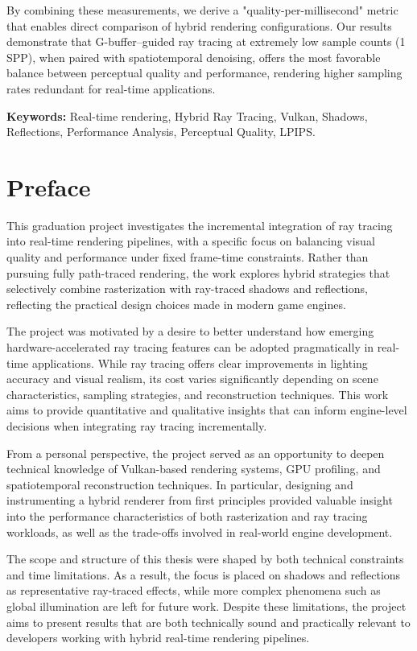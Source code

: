 \documentclass[12pt,a4paper]{report}
\newcommand{\daechapterNoNum}[1]{
  \chapter*{#1}
  \addcontentsline{toc}{chapter}{#1}
}
\begin{document}
By combining these measurements, we derive a "quality-per-millisecond" metric that enables direct comparison of hybrid rendering configurations.
Our results demonstrate that G-buffer–guided ray tracing at extremely low sample counts (1 SPP), when paired with spatiotemporal denoising, offers the most favorable balance between perceptual quality and performance,
rendering higher sampling rates redundant for real-time applications.
\begin{gbox}
\textbf{Keywords:} Real-time rendering, Hybrid Ray Tracing, Vulkan, Shadows, Reflections, Performance Analysis, Perceptual Quality, LPIPS.
\end{gbox}

\daechapterNoNum{Preface}
This graduation project investigates the incremental integration of ray tracing into real-time rendering pipelines, with a specific focus on balancing visual quality and performance under fixed frame-time constraints.
Rather than pursuing fully path-traced rendering, the work explores hybrid strategies that selectively combine rasterization with ray-traced shadows and reflections, reflecting the practical design choices made in modern game engines.

The project was motivated by a desire to better understand how emerging hardware-accelerated ray tracing features can be adopted pragmatically in real-time applications.
While ray tracing offers clear improvements in lighting accuracy and visual realism, its cost varies significantly depending on scene characteristics, sampling strategies, and reconstruction techniques.
This work aims to provide quantitative and qualitative insights that can inform engine-level decisions when integrating ray tracing incrementally.

From a personal perspective, the project served as an opportunity to deepen technical knowledge of Vulkan-based rendering systems, GPU profiling, and spatiotemporal reconstruction techniques.
In particular, designing and instrumenting a hybrid renderer from first principles provided valuable insight into the performance characteristics of both rasterization and ray tracing workloads, as well as the trade-offs involved in real-world engine development.

The scope and structure of this thesis were shaped by both technical constraints and time limitations.
As a result, the focus is placed on shadows and reflections as representative ray-traced effects, while more complex phenomena such as global illumination are left for future work.
Despite these limitations, the project aims to present results that are both technically sound and practically relevant to developers working with hybrid real-time rendering pipelines.
\end{document}
